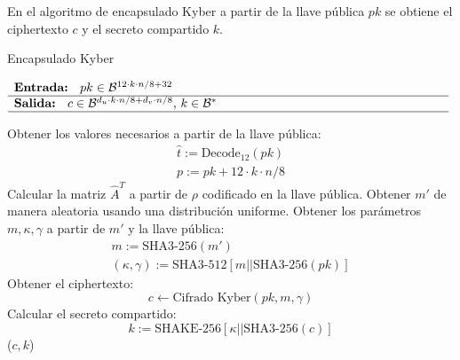  En el algoritmo de encapsulado Kyber a partir de la llave pública \(pk\) se obtiene el ciphertexto \(c\) y el secreto compartido \(k\). 
\begin{algorithm}[H]
	\small 
	\caption{Encapsulado Kyber}
	$\begin{array}{p{\textwidth}}
		\textbf{Entrada: } \(pk\in \mathcal{B}^{12\cdot k\cdot n/8+32}\)\\ 
		\hline
		\textbf{Salida: } \(c\in \mathcal{B}^{d_u\cdot k\cdot n/8+d_v\cdot n/8}\), \(k\in \mathcal{B}^{*}\)\\ 
		\hline
	\end{array}$
	\begin{algorithmic}[1]
		\State Obtener los valores necesarios a partir de la llave pública:
		\begin{equation}
			\begin{array}{l}
			\hat{t}:=\text{Decode}_{12}(pk)\\
			p:=pk+12\cdot k\cdot n/8
			\end{array} 
		\end{equation}
		\State Calcular la matriz \(\hat{A}^T\) a partir de \(\rho\) codificado en la llave pública.
		\State Obtener \(m'\) de manera aleatoria usando una distribución uniforme.
		\State Obtener los parámetros \(m, \kappa, \gamma\) a partir de \(m'\) y la llave pública:
		\begin{equation}
			\begin{array}{l}
				m:=\text{SHA3-256}(m')\\
				(\kappa,\gamma):=\text{SHA3-512}[m||\text{SHA3-256}(pk)]
			\end{array} 
		\end{equation}
		\State Obtener el ciphertexto:
		\begin{equation}
			c \gets \text{Cifrado Kyber}(pk,m,\gamma)
		\end{equation}
		\State Calcular el secreto compartido:
		\begin{equation}
			k:= \text{SHAKE-256}[\kappa||\text{SHA3-256}(c)]
		\end{equation}
		\State \Return (\(c,k\))
	\end{algorithmic}
\end{algorithm}

